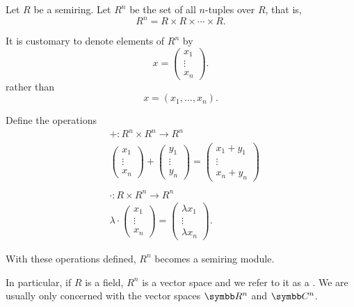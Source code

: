 \begin{definition}\label{def:left_module_of_tuples}
  Let \( R \) be a semiring. Let \( R^n \) be the set of all \( n \)-tuples over \( R \), that is,
  \begin{equation*}
    R^n = R \times R \times \cdots \times R.
  \end{equation*}

  It is customary to denote elements of \( R^n \) by
  \begin{equation*}
    x = \begin{pmatrix} x_1 \\ \vdots \\ x_n \end{pmatrix}.
  \end{equation*}
  rather than
  \begin{equation*}
    x = (x_1, \ldots, x_n).
  \end{equation*}

  Define the operations
  \begin{align*}
    &+: R^n \times R^n \to R^n
    \\
    &\begin{pmatrix} x_1 \\ \vdots \\ x_n \end{pmatrix}
    +
    \begin{pmatrix} y_1 \\ \vdots \\ y_n \end{pmatrix}
    =
    \begin{pmatrix} x_1 + y_1 \\ \vdots \\ x_n + y_n \end{pmatrix}
    \\
    \\
    &\cdot: R \times R^n \to R^n
    \\
    &\lambda \cdot \begin{pmatrix} x_1 \\ \vdots \\ x_n \end{pmatrix}
    =
    \begin{pmatrix} \lambda x_1 \\ \vdots \\ \lambda x_n \end{pmatrix}.
  \end{align*}

  With these operations defined, \( R^n \) becomes a semiring module.

  In particular, if \( R \) is a field, \( R^n \) is a vector space and we refer to it as a . We are usually only concerned with the vector spaces \( \R^n \) and \( \BB{C}^n \).
\end{definition}

